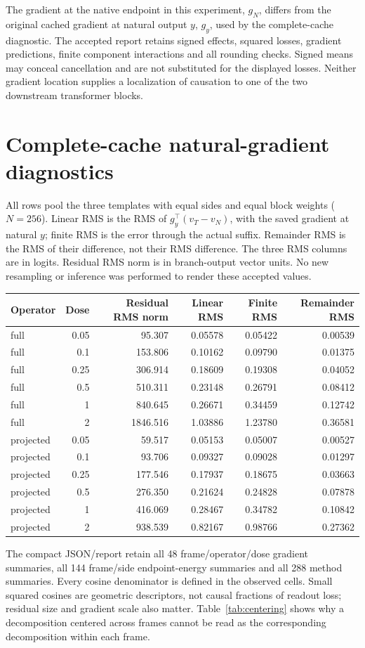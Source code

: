 The gradient at the native endpoint in this experiment, $g_N$, differs from the original cached gradient at natural output $y$, $g_y$, used by the complete-cache diagnostic. The accepted report retains signed effects, squared losses, gradient predictions, finite component interactions and all rounding checks. Signed means may conceal cancellation and are not substituted for the displayed losses. Neither gradient location supplies a localization of causation to one of the two downstream transformer blocks.
\section{Complete-cache natural-gradient diagnostics}\label{app:cachegeometry}
All rows pool the three templates with equal sides and equal block weights ($N=256$). Linear RMS is the RMS of $g_y^\top(v_T-v_N)$, with the saved gradient at natural $y$; finite RMS is the error through the actual suffix. Remainder RMS is the RMS of their difference, not their RMS difference. The three RMS columns are in logits. Residual RMS norm is in branch-output vector units. No new resampling or inference was performed to render these accepted values.
\begin{center}\small
\begin{tabular}{lrrrrr}\toprule Operator & Dose & Residual RMS norm & Linear RMS & Finite RMS & Remainder RMS\\\midrule
full & 0.05 & 95.307 & 0.05578 & 0.05422 & 0.00539\\
full & 0.1 & 153.806 & 0.10162 & 0.09790 & 0.01375\\
full & 0.25 & 306.914 & 0.18609 & 0.19308 & 0.04052\\
full & 0.5 & 510.311 & 0.23148 & 0.26791 & 0.08412\\
full & 1 & 840.645 & 0.26671 & 0.34459 & 0.12742\\
full & 2 & 1846.516 & 1.03886 & 1.23780 & 0.36581\\
projected & 0.05 & 59.517 & 0.05153 & 0.05007 & 0.00527\\
projected & 0.1 & 93.706 & 0.09327 & 0.09028 & 0.01297\\
projected & 0.25 & 177.546 & 0.17937 & 0.18675 & 0.03663\\
projected & 0.5 & 276.350 & 0.21624 & 0.24828 & 0.07878\\
projected & 1 & 416.069 & 0.28467 & 0.34782 & 0.10842\\
projected & 2 & 938.539 & 0.82167 & 0.98766 & 0.27362\\
\bottomrule\end{tabular}\end{center}
The compact JSON/report retain all 48 frame/operator/dose gradient summaries, all 144 frame/side endpoint-energy summaries and all 288 method summaries. Every cosine denominator is defined in the observed cells. Small squared cosines are geometric descriptors, not causal fractions of readout loss; residual size and gradient scale also matter. Table~\ref{tab:centering} shows why a decomposition centered across frames cannot be read as the corresponding decomposition within each frame.

